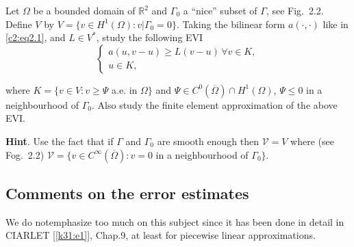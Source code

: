 \begin{exercise}\label{c2:exer2.5}%
Let $\Omega$ be a bounded domain of $\mathbb{R}^2$ and $\Gamma_0$ a
``nice'' subset of $\Gamma$, see Fig.~2.2. Define $V$ by $V = \{v
\in H^1 (\Omega) : v|{\Gamma_0 } = 0 \}$. Taking the bilinear
form $a(\cdot , \cdot)$ like in  \eqref{c2:eq2.1}, and $L \in V^*$, study
the following EVI 
$$
\begin{cases}
a (u, v - u)\geq L(v - u)\, \forall  v \in K,\\
u \in K,
\end{cases}
$$
\end{exercise}
where $K = \{v \in V : v \geq  \Psi$ a.e. in $\Omega \}$ and
$\Psi \in C^0 (\overline{\Omega}) \cap H^1 (\Omega)$, $\Psi \leq
0$ in a neighbourhood of $\Gamma_0$. Also study the finite element
approximation of the above EVI. 

\textbf{Hint}. Use the fact that if $\Gamma$ and $\Gamma_0$ are smooth
enough then $\mathscr{V} = V$ where (see Fog.~2.2) $\mathscr{V}  = \{v
\in C^\infty (\overline{\Omega}) : v = 0$ in a neighbourhood of
$\Gamma_0 \}$.  

\begin{figure}[H]
\caption{}
\end{figure}

\subsection{Comments on the error estimates}\label{c2:ss2.7}

We do not\pageoriginale  emphasize too much on this subject since it
has been done in 
detail in CIARLET [\ref{k31:e1}], Chap.9, at least for piecewise linear
approximations. 

